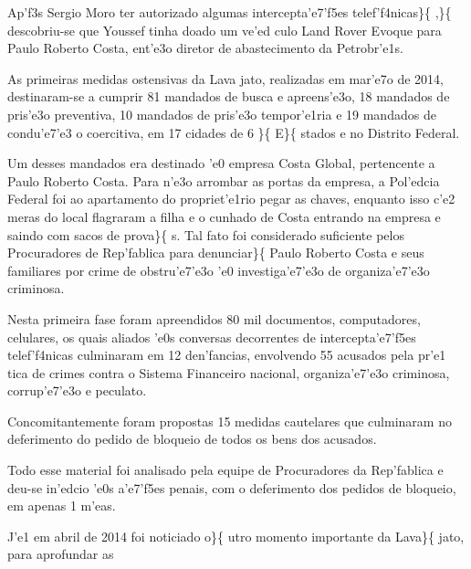 \par 

Ap'f3s Sergio Moro ter autorizado algumas intercepta'e7'f5es
telef'f4nicas\}\{\rtlch{}  \ltrch{} 
,\}\{\rtlch{}  \ltrch{} 
descobriu-se que Youssef tinha doado um ve'ed culo Land Rover Evoque
para Paulo Roberto Costa, ent'e3o diretor de abastecimento da
Petrobr'e1s. \par As primeiras medidas ostensivas da Lava jato,
realizadas em mar'e7o de 2014, destinaram-se a cumprir 81 mandados de
busca e apreens'e3o, 18 mandados de pris'e3o preventiva, 10 mandados de
pris'e3o tempor'e1ria e 19 mandados de condu'e7'e3 o coercitiva, em 17
cidades de 6 \}\{\rtlch{}  \ltrch{} 
E\}\{\rtlch{}  \ltrch{} 
stados e no Distrito Federal. \par Um desses mandados era destinado 'e0
empresa Costa Global, pertencente a Paulo Roberto Costa. Para n'e3o
arrombar as portas da empresa, a Pol'edcia Federal foi ao apartamento do
propriet'e1rio pegar as chaves, enquanto isso c'e2 meras do local
flagraram a filha e o cunhado de Costa entrando na empresa e saindo com
sacos de prova\}\{\rtlch{}  \ltrch{}  s. Tal
fato foi considerado suficiente pelos Procuradores de Rep'fablica para
denunciar\}\{\rtlch{}  \ltrch{}
 Paulo Roberto Costa e seus familiares
por crime de obstru'e7'e3o 'e0 investiga'e7'e3o de organiza'e7'e3o
criminosa. \par Nesta primeira fase foram apreendidos 80 mil documentos,
computadores, celulares, os quais aliados 'e0s conversas decorrentes de
intercepta'e7'f5es telef'f4nicas culminaram em 12 den'fancias,
envolvendo 55 acusados pela pr'e1 tica de crimes contra o Sistema
Financeiro nacional, organiza'e7'e3o criminosa, corrup'e7'e3o e
peculato. \par Concomitantemente foram propostas 15 medidas cautelares
que culminaram no deferimento do pedido de bloqueio de todos os bens dos
acusados. \par Todo esse material foi analisado pela equipe de
Procuradores da Rep'fablica e deu-se in'edcio 'e0s a'e7'f5es penais, com
o deferimento dos pedidos de bloqueio, em apenas 1 m'eas. \par J'e1 em
abril de 2014 foi noticiado o\}\{\rtlch{}  \ltrch{}
 utro momento importante da Lava\}\{\rtlch{} 
\ltrch{}  jato, para aprofundar as
